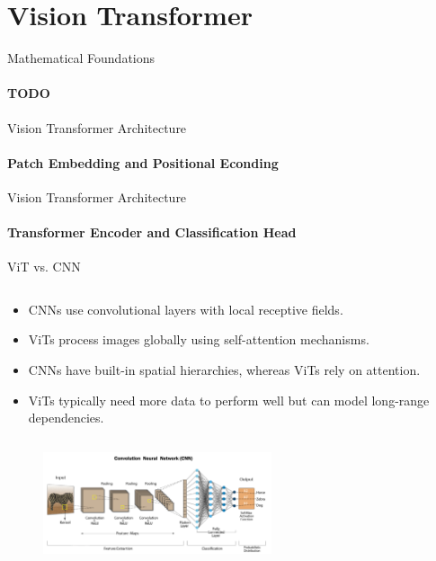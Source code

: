 \section{Vision Transformer}

\begin{frame}[fragile]{Mathematical Foundations}
\framesubtitle{TODO}

\end{frame}

\begin{frame}[fragile]{Vision Transformer Architecture}
\framesubtitle{Patch Embedding and Positional Econding}

\end{frame}

\begin{frame}[fragile]{Vision Transformer Architecture}
\framesubtitle{Transformer Encoder and Classification Head}

\end{frame}

\begin{frame}[fragile]{ViT vs. CNN}
  \begin{columns}
    \begin{column}{\textwidth}
      \begin{itemize}
        \item CNNs use convolutional layers with local receptive fields.
        \item ViTs process images globally using self-attention mechanisms.
        \item CNNs have built-in spatial hierarchies, whereas ViTs rely on attention.
        \item ViTs typically need more data to perform well but can model long-range dependencies.
      \end{itemize}
    \end{column}
  \end{columns}
  \begin{figure}
    \includegraphics[width=0.6\textwidth]{images/cnn_architecture.png}
  \end{figure}
\end{frame}